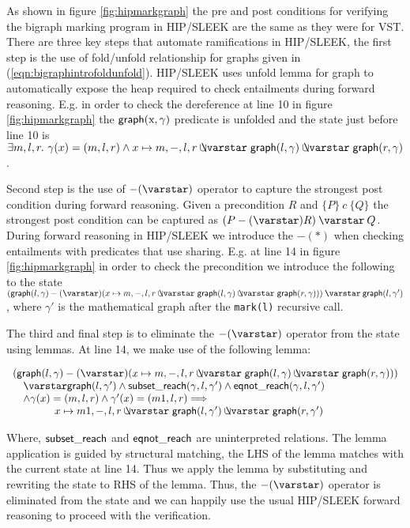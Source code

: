 As shown in figure \ref{fig:hipmarkgraph} the pre and post conditions for verifying the bigraph marking program in HIP/SLEEK are the same as they were for VST. There are three key steps that automate ramifications in HIP/SLEEK, the first step is the use of fold/unfold relationship for graphs given in (\ref{eqn:bigraphintrofoldunfold}). HIP/SLEEK uses unfold lemma for graph to automatically expose the heap required to check entailments during forward reasoning. E.g. in order to check the dereference at line 10 in figure \ref{fig:hipmarkgraph} the $\mathsf{graph}(\text{x},\gamma)$ predicate is unfolded and the state just before line 10 is $ \exists m,l,r.~ \gamma(x)=(m,l,r) \wedge x \mapsto m,-,l,r \ocon \p{graph}(l, \gamma) \ocon \p{graph}(r, \gamma)$.

Second step is the use of $-(\scon)$ operator to capture the strongest post condition during forward reasoning. Given a precondition $R$ and $\{P\}~c~\{Q\}$ the strongest post condition can be captured as $(P -(\scon) R) \scon Q$. During forward reasoning in HIP/SLEEK we introduce the $-(*)$ when checking entailments with predicates that use sharing. E.g. at line 14 in figure \ref{fig:hipmarkgraph} in order to check the precondition we introduce the following to the state $ (\p{graph}(l, \gamma) -(\scon) (x \mapsto m,-,l,r \ocon \p{graph}(l, \gamma) \ocon \p{graph}(r, \gamma))) \scon \p{graph}(l, \gamma')$, where $\gamma'$ is the mathematical graph after the \texttt{mark(l)} recursive call.

The third and final step is to eliminate the $-(\scon)$ operator from the state using lemmas. At line 14, we make use of the following lemma:

\[
\begin{array}{l}
(\p{graph}(l, \gamma) -(\scon) (x \mapsto m,-,l,r \ocon \p{graph}(l, \gamma) \ocon \p{graph}(r, \gamma))) \\
\quad \scon \p{graph}(l, \gamma') \wedge \p{subset\_reach}(\gamma,l,\gamma') \wedge \p{eqnot\_reach}(\gamma,l,\gamma') \\
\quad \wedge  \gamma(x)=(m,l,r) \wedge \gamma'(x)=(m1,l,r) ==> \\
\qquad \qquad x \mapsto m1,-,l,r \ocon \p{graph}(l, \gamma') \ocon \p{graph}(r, \gamma')
\end{array}
\]

Where, $\mathsf{subset\_reach}$ and $\mathsf{eqnot\_reach}$ are uninterpreted relations. The lemma application is guided by structural matching, the LHS of the lemma matches with the current state at line 14. Thus we apply the lemma by substituting and rewriting the state to RHS of the lemma. Thus, the $-(\scon)$ operator is eliminated from the state and we can happily use the usual HIP/SLEEK forward reasoning to proceed with the verification.

